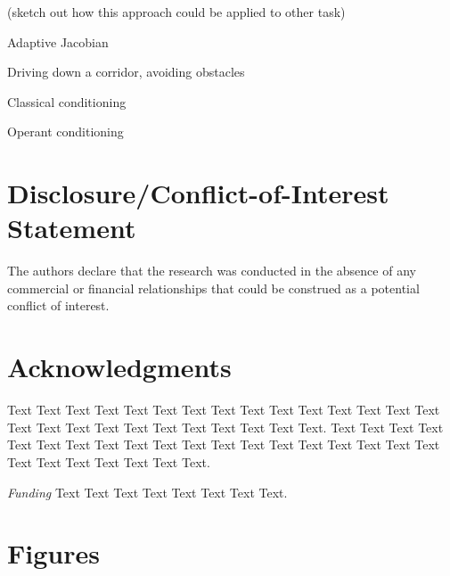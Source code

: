 \documentclass{frontiersSCNS} %
\begin{document}
(sketch out how this approach could be applied to other task)

Adaptive Jacobian

Driving down a corridor, avoiding obstacles

Classical conditioning

Operant conditioning 


\section*{Disclosure/Conflict-of-Interest Statement}

The authors declare that the research was conducted in the absence of any commercial or financial relationships that could be construed as a potential conflict of interest.

\section*{Acknowledgments}
Text Text Text Text Text Text  Text Text Text Text Text Text Text Text  Text Text Text Text Text Text Text Text Text  Text Text Text. Text Text Text Text Text Text  Text Text Text Text Text Text Text Text  Text Text Text Text Text Text Text Text Text  Text Text Text. 

\textit{Funding\textcolon} Text Text Text Text Text Text  Text Text.




\section*{Figures}

\end{document}
